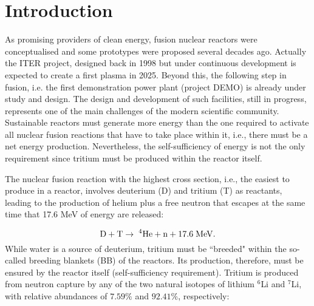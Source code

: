 \documentclass[jcp,amsmath,amssymb,preprint]{revtex4-1}
\begin{document}
\maketitle

\section{\label{intro} Introduction} 
As promising providers of clean energy, fusion nuclear reactors were conceptualised and some prototypes were proposed several decades ago.  Actually the ITER project\cite{iter-web},  designed back in 1998\cite{aymar2002iter} but under continuous development is expected to create a first plasma in 2025.  Beyond this,  the following step in fusion, i.e. the first demonstration power plant (project DEMO) is already under study and design\cite{federici2019overview}.  The design and development of such facilities, still in progress, represents one of the main challenges of the modern scientific community.  Sustainable reactors must generate more energy than the one required to activate all nuclear fusion reactions that have to take place within it, i.e., there must be a net energy production. Nevertheless, the self-sufficiency of energy is not the only requirement since tritium must be produced within the reactor itself. 

The nuclear fusion reaction with the highest cross section, i.e., the easiest to produce in a reactor, involves deuterium (D) and tritium (T) as reactants, leading to the production of helium plus a free neutron that escapes at the same time that 17.6 MeV of energy are released\cite{kordavc2017helium}:

\begin{equation} 
        {\rm D} + {\rm T} \rightarrow \;^{4}{\rm He} + {\rm n}+ 17.6\; {\rm MeV}.
    \label{eq0}
\end{equation}
While water is a source of deuterium, tritium must be ``breeded" within the so-called breeding blankets (BB) of the reactors.  Its production, therefore, must be ensured by the reactor itself (self-sufficiency requirement).  Tritium is produced from neutron capture by any of the two natural isotopes of lithium $^6$Li and $^7$Li, with relative abundances of $7.59 \%$ and $92.41 \%$, respectively\cite{rubel2019fusion}:
\end{document}

